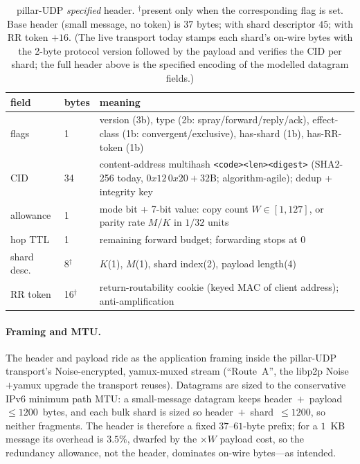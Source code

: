 \documentclass[10pt,twocolumn]{article}
\newcommand{\code}[1]{\texttt{\small #1}}
\begin{document}
\begin{table}[t]
\centering\small
\begin{tabular}{@{}llp{}@{}}
\toprule
field & bytes & meaning \\
\midrule
flags & 1 & version (3b), type (2b: spray/forward/reply/ack), effect-class
(1b: convergent/exclusive), has-shard (1b), has-RR-token (1b) \\
CID & 34 & content-address multihash \code{<code><len><digest>} (SHA2-256
today, $0x12\,0x20{+}32$B; algorithm-agile); dedup + integrity key \\
allowance & 1 & mode bit + 7-bit value: copy count $W\in[1,127]$, or parity rate
$M/K$ in $1/32$ units \\
hop TTL & 1 & remaining forward budget; forwarding stops at 0 \\
shard desc.\ & 8$^\dagger$ & $K$(1), $M$(1), shard index(2), payload length(4) \\
RR token & 16$^\dagger$ & return-routability cookie (keyed MAC of client
address); anti-amplification \\
\bottomrule
\end{tabular}
\caption{pillar-UDP \emph{specified} header. $^\dagger$present only when the
corresponding flag is set. Base header (small message, no token) is $37$ bytes;
with shard descriptor $45$; with RR token $+16$. (The live transport today stamps
each shard's on-wire bytes with the 2-byte protocol version followed by the
payload and verifies the CID per shard; the full header above is the specified
encoding of the modelled datagram fields.)}
\label{tab:header}
\end{table}

\paragraph{Framing and MTU.}
The header and payload ride as the application framing inside the pillar-UDP
transport's Noise-encrypted, yamux-muxed stream (``Route~A'', the libp2p
Noise$+$yamux upgrade the transport reuses). Datagrams are sized to the
conservative IPv6 minimum path MTU: a small-message datagram keeps
header~$+$~payload~$\le 1200$~bytes, and each bulk shard is sized so
header~$+$~shard~$\le 1200$, so neither fragments. The header is therefore a fixed
$37$--$61$-byte prefix; for a $1$~KB message its overhead is $3.5\%$, dwarfed by
the $\times W$ payload cost, so the redundancy allowance, not the header,
dominates on-wire bytes---as intended.
\end{document}
